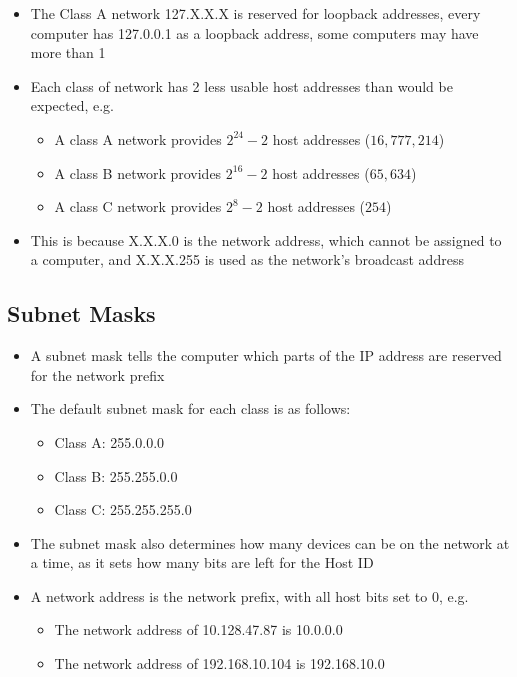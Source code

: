 \begin{itemize}
\begin{itemize}
  \end{itemize}
  \item The Class A network 127.X.X.X is reserved for loopback addresses, every computer has 127.0.0.1 as a loopback address, some computers may have more than 1
  \item Each class of network has 2 less usable host addresses than would be expected, e.g.
  \begin{itemize}
    \item A class A network provides $2^{24} - 2$ host addresses ($16,777,214$)
    \item A class B network provides $2^{16} - 2$ host addresses ($65,634$)
    \item A class C network provides $2^8 - 2$ host addresses ($254$)
  \end{itemize}
  \item This is because X.X.X.0 is the network address, which cannot be assigned to a computer, and X.X.X.255 is used as the network's broadcast address
\end{itemize}

\subsection*{Subnet Masks}

\begin{itemize}
  \item A subnet mask tells the computer which parts of the IP address are reserved for the network prefix
  \item The default subnet mask for each class is as follows:
  \begin{itemize}
    \item Class A: 255.0.0.0
    \item Class B: 255.255.0.0
    \item Class C: 255.255.255.0
  \end{itemize}
  \item The subnet mask also determines how many devices can be on the network at a time, as it sets how many bits are left for the Host ID
  \item A network address is the network prefix, with all host bits set to 0, e.g.
  \begin{itemize}
    \item The network address of 10.128.47.87 is 10.0.0.0
    \item The network address of 192.168.10.104 is 192.168.10.0
  \end{itemize}
\end{itemize}